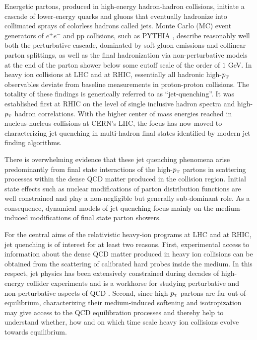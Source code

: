 Energetic partons, produced in high-energy hadron-hadron collisions, initiate a cascade of lower-energy quarks and gluons that eventually hadronize into collimated sprays of colorless hadrons called jets. Monte Carlo (MC) event generators of $e^+e^-$ and pp collisions, such as PYTHIA \cite{Sjostrand:2007gs}, describe reasonably well both the perturbative cascade, dominated by soft gluon emissions and collinear parton splittings, as well as the final hadronization via non-perturbative models at the end of the parton shower below some cutoff scale of the order of $1$ GeV. In heavy ion collisions at LHC and at RHIC, essentially all hadronic high-$p_{\text{\tiny T}}$ observables deviate from baseline measurements in proton-proton collisions. The totality of these findings is generically referred to as ``jet-quenching''. It was established first at RHIC on the level of single inclusive hadron spectra and high-$p_{\text{\tiny T}}$ hadron correlations. With the higher center of mass energies reached in nucleus-nucleus collisions at CERN's LHC, the focus has now moved to characterizing jet quenching in multi-hadron final states identified by modern jet finding algorithms.

There is overwhelming evidence that these jet quenching phenomena arise predominantly from final state interactions of the high-$p_{\text{\tiny T}}$ partons in scattering processes within the dense QCD matter produced in the collision region. Initial state effects such as nuclear modifications of parton distribution functions are well constrained and play a non-negligible but generally sub-dominant role. As a consequence, dynamical models of jet quenching focus mainly on the medium-induced modifications of final state parton showers. 

For the central aims of the relativistic heavy-ion programs at LHC and at RHIC, jet quenching is of interest for at least two reasons. First, experimental access to information about the dense QCD matter produced in heavy ion collisions can be obtained from the scattering of calibrated hard probes inside the medium. 
In this respect, jet physics has been extensively constrained during decades of high-energy collider experiments and is a workhorse for studying perturbative and non-perturbative aspects of QCD \cite{Ellis:1991qj}.
Second, since high-$p_{\text{\tiny T}}$ partons are far out-of-equilibrium, characterizing their medium-induced softening and isotropization may give access to the QCD equilibration processes and thereby help to understand whether, how and on which time scale heavy ion collisions evolve towards equilibrium. 

